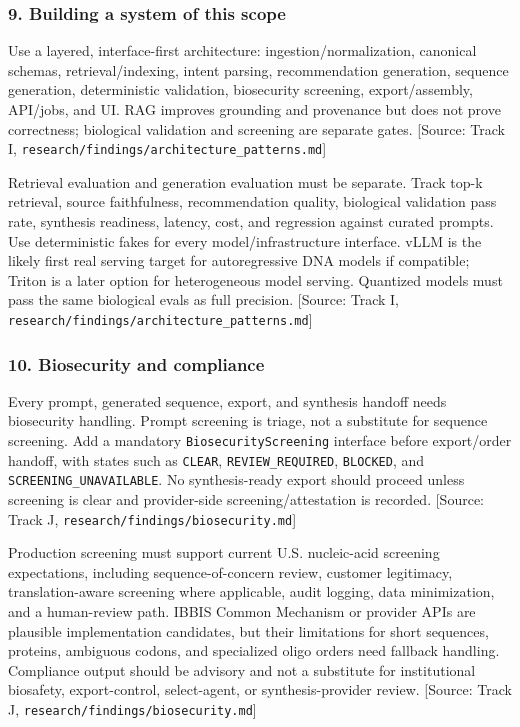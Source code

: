 \documentclass[11pt]{report}
\begin{document}
\subsubsection{9. Building a system of this scope}

Use a layered, interface-first architecture: ingestion/normalization, canonical schemas, retrieval/indexing, intent parsing, recommendation generation, sequence generation, deterministic validation, biosecurity screening, export/assembly, API/jobs, and UI. RAG improves grounding and provenance but does not prove correctness; biological validation and screening are separate gates. [Source: Track I, \texttt{research/findings/architecture\_patterns.md}]\par

Retrieval evaluation and generation evaluation must be separate. Track top-k retrieval, source faithfulness, recommendation quality, biological validation pass rate, synthesis readiness, latency, cost, and regression against curated prompts. Use deterministic fakes for every model/infrastructure interface. vLLM is the likely first real serving target for autoregressive DNA models if compatible; Triton is a later option for heterogeneous model serving. Quantized models must pass the same biological evals as full precision. [Source: Track I, \texttt{research/findings/architecture\_patterns.md}]\par

\subsubsection{10. Biosecurity and compliance}

Every prompt, generated sequence, export, and synthesis handoff needs biosecurity handling. Prompt screening is triage, not a substitute for sequence screening. Add a mandatory \texttt{BiosecurityScreening} interface before export/order handoff, with states such as \texttt{CLEAR}, \texttt{REVIEW\_REQUIRED}, \texttt{BLOCKED}, and \texttt{SCREENING\_UNAVAILABLE}. No synthesis-ready export should proceed unless screening is clear and provider-side screening/attestation is recorded. [Source: Track J, \texttt{research/findings/biosecurity.md}]\par

Production screening must support current U.S. nucleic-acid screening expectations, including sequence-of-concern review, customer legitimacy, translation-aware screening where applicable, audit logging, data minimization, and a human-review path. IBBIS Common Mechanism or provider APIs are plausible implementation candidates, but their limitations for short sequences, proteins, ambiguous codons, and specialized oligo orders need fallback handling. Compliance output should be advisory and not a substitute for institutional biosafety, export-control, select-agent, or synthesis-provider review. [Source: Track J, \texttt{research/findings/biosecurity.md}]\par
\end{document}
